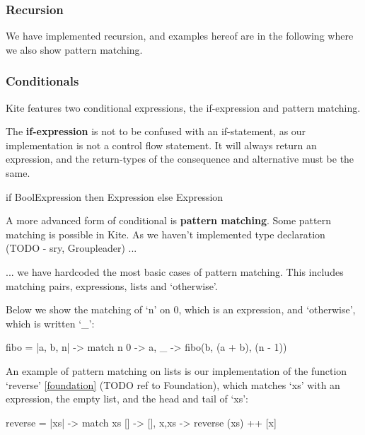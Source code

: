 \subsubsection{Recursion}

We have implemented recursion, and examples hereof are in the following where we also show pattern matching.

\subsubsection{Conditionals}

Kite features two conditional expressions, the if-expression and pattern matching.



The \textbf{if-expression} is not to be confused with an if-statement, as our implementation is not a control flow statement. It will always return an expression, and the return-types of the consequence and alternative must be the same.


\begin{kite}
  
  if BoolExpression then Expression else Expression
\end{kite}


A more advanced form of conditional is \textbf{pattern matching}. Some pattern matching is possible in Kite. As we haven't implemented type declaration (TODO - sry, Groupleader) ...

... we have hardcoded the most basic cases of pattern matching. This includes matching pairs, expressions, lists and `otherwise'.


Below we show the matching of `n' on 0, which is an expression, and `otherwise', which is written `\_':
\begin{kite}

fibo = |a, b, n| -> {
    match n {
    0 -> a,
    _ -> fibo(b, (a + b), (n - 1))
    }
}
\end{kite}

An example of pattern matching on lists is our implementation of the function `reverse' \ref{foundation} (TODO ref to Foundation), which matches `xs' with an expression, the empty list, and the head and tail of `xs':

\begin{kite}

reverse = |xs| -> {
  match xs {
    []    -> [],
    x,xs  -> reverse (xs) ++ [x]
  }
}

\end{kite}


